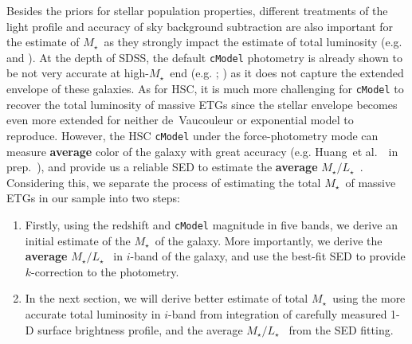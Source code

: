 \documentclass[preprint]{aastex}
\def\etal{{\ et al.~}}
\def\mstar{{$M_{\star}$}~}
\def\m2l{{$M_{\star}/L_{\star}$}~}
\begin{document}
\begin{CJK*}{UTF8}{gbsn}
    Besides the priors for stellar population properties, different treatments of 
    the light profile and accuracy of sky background subtraction are also important
    for the estimate of \mstar as they strongly impact the estimate of total luminosity
    (e.g.\ \citealt{Bernardi2013} and \citealt{DSouza2015}).  
    At the depth of SDSS, the default \texttt{cModel} photometry is already shown to 
    be not very accurate at high-\mstar end (e.g. \citealt{Meert2015}; 
    \citealt{Bernardi2016a}) as it does not capture the extended envelope of these 
    galaxies. 
    As for HSC, it is much more challenging for \texttt{cModel} to recover the total 
    luminosity of massive ETGs since the stellar envelope becomes even more 
    extended for neither de~Vaucouleur or exponential model to reproduce.  
    However, the HSC \texttt{cModel} under the force-photometry mode can measure 
    \textbf{average} color of the galaxy with great accuracy (e.g. Huang\etal~in prep.~), 
    and provide us a reliable SED to estimate the \textbf{average} \m2l. 
    Considering this, we separate the process of estimating the total \mstar of 
    massive ETGs in our sample into two steps: 
    
    \begin{enumerate}
        \item Firstly, using the redshift and \texttt{cModel} magnitude in five bands, 
            we derive an initial estimate of the \mstar of the galaxy.  
            More importantly, we derive the \textbf{average} \m2l in $i$-band of the 
            galaxy, and use the best-fit SED to provide $k$-correction to the photometry.  
        \item In the next section, we will derive better estimate of total \mstar using 
            the more accurate total luminosity in $i$-band from integration of carefully 
            measured 1-D surface brightness profile, and the average \m2l from the SED
            fitting.  
    \end{enumerate}
    

\end{CJK*}
\end{document}
